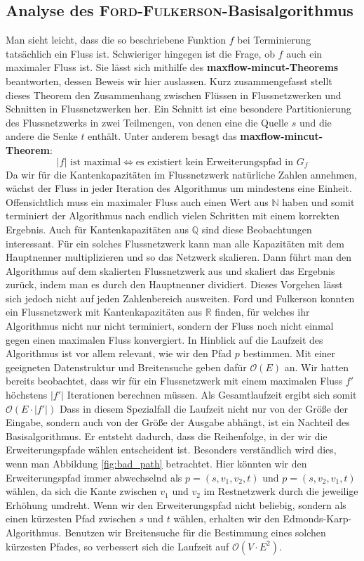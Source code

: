 \documentclass[12pt,a4paper,titlepage,onecolumn,ngerman,bibliography=totocnumbered]{scrartcl}
\theoremstyle{definition}
\theoremstyle{remark}
\newcommand{\ff}{\textsc{Ford-Fulkerson}}
\begin{document}
\subsection{Analyse des \ff -Basisalgorithmus}
Man sieht leicht, dass die so beschriebene Funktion $f$ bei Terminierung tatsächlich ein Fluss ist.
Schwieriger hingegen ist die Frage, ob $f$ auch ein maximaler Fluss ist.
Sie lässt sich mithilfe des \textbf{maxflow-mincut-Theorems} beantworten, dessen Beweis wir hier auslassen.
Kurz zusammengefasst stellt dieses Theorem den Zusammenhang zwischen Flüssen in Flussnetzwerken und Schnitten in Flussnetzwerken her.
Ein Schnitt ist eine besondere Partitionierung des Flussnetzwerks in zwei Teilmengen, von denen eine die Quelle $s$ und die andere die Senke $t$ enthält.
Unter anderem besagt das \textbf{maxflow-mincut-Theorem}:
\begin{equation}
	\lvert f\rvert\text{ ist maximal} \Leftrightarrow \text{es existiert kein Erweiterungspfad in $G_{f}$}
\end{equation}
Da wir für die Kantenkapazitäten im Flussnetzwerk natürliche Zahlen annehmen, wächst der Fluss in jeder Iteration des Algorithmus um mindestens eine Einheit.
Offensichtlich muss ein maximaler Fluss auch einen Wert aus $\mathbb{N}$ haben und somit terminiert der Algorithmus nach endlich vielen Schritten mit einem korrekten Ergebnis.
Auch für Kantenkapazitäten aus $\mathbb{Q}$ sind diese Beobachtungen interessant.
Für ein solches Flussnetzwerk kann man alle Kapazitäten mit dem Hauptnenner multiplizieren und so das Netzwerk \glqq skalieren\grqq{}.
Dann führt man den Algorithmus auf dem skalierten Flussnetzwerk aus und skaliert das Ergebnis zurück, indem man es durch den Hauptnenner dividiert.
Dieses Vorgehen lässt sich jedoch nicht auf jeden Zahlenbereich ausweiten.
Ford und Fulkerson konnten ein Flussnetzwerk mit Kantenkapazitäten aus $\mathbb{R}$ finden, für welches ihr Algorithmus nicht nur nicht terminiert, sondern der Fluss noch nicht einmal gegen einen maximalen Fluss konvergiert.
\medbreak
In Hinblick auf die Laufzeit des Algorithmus ist vor allem relevant, wie wir den Pfad $p$ bestimmen.
Mit einer geeigneten Datenstruktur und Breitensuche geben \cite{Cormen09} dafür $\mathcal{O}(E)$ an.
Wir hatten bereits beobachtet, dass wir für ein Flussnetzwerk mit einem maximalen Fluss $f'$ höchstens $\lvert f'\rvert$ Iterationen berechnen müssen.
Als Gesamtlaufzeit ergibt sich somit $\mathcal{O}(E\cdot\lvert f'\rvert)$
Dass in diesem Spezialfall die Laufzeit nicht nur von der Größe der Eingabe, sondern auch von der Größe der Ausgabe abhängt, ist ein Nachteil des Basisalgorithmus.
Er entsteht dadurch, dass die Reihenfolge, in der wir die Erweiterungspfade wählen entscheident ist.
Besonders verständlich wird dies, wenn man Abbildung \ref{fig:bad_path} betrachtet.
Hier könnten wir den Erweiterungspfad immer abwechselnd als $p = (s,v_1,v_2,t)$ und $p = (s,v_2,v_1,t)$ wählen, da sich die Kante zwischen $v_1$ und $v_2$ im Restnetzwerk durch die jeweilige Erhöhung umdreht.
Wenn wir den Erweiterungspfad nicht beliebig, sondern als einen kürzesten Pfad zwischen $s$ und $t$ wählen, erhalten wir den Edmonds-Karp-Algorithmus.
Benutzen wir Breitensuche für die Bestimmung eines solchen kürzesten Pfades, so verbessert sich die Laufzeit auf $\mathcal{O}(V\cdot E^2)$.
\end{document}
